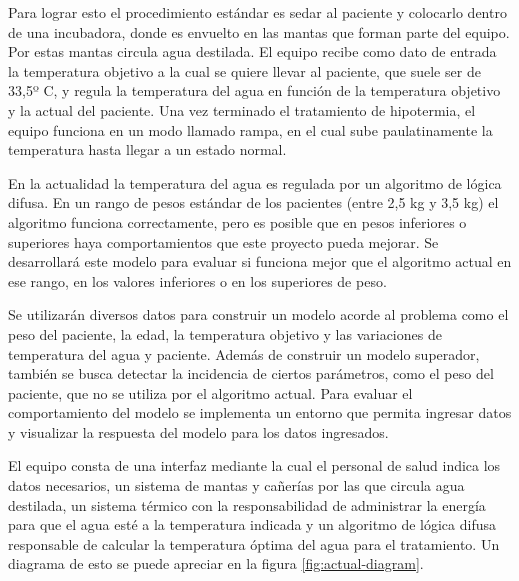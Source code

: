 Para lograr esto el procedimiento estándar es sedar al paciente y colocarlo dentro de una incubadora, donde es envuelto en las mantas que forman parte del equipo. Por estas mantas circula agua destilada. El equipo recibe como dato de entrada la temperatura objetivo a la cual se quiere llevar al paciente, que suele ser de 33,5º C, y regula la temperatura del agua en función de la temperatura objetivo y la actual del paciente. Una vez terminado el tratamiento de hipotermia, el equipo funciona en un modo llamado rampa, en el cual sube paulatinamente la temperatura hasta llegar a un estado normal.

En la actualidad la temperatura del agua es regulada por un algoritmo de lógica difusa. En un rango de pesos estándar de los pacientes (entre 2,5 kg y 3,5 kg) el algoritmo funciona correctamente, pero es posible que en pesos inferiores o superiores haya comportamientos que este proyecto pueda mejorar. Se desarrollará este modelo para evaluar si funciona mejor que el algoritmo actual en ese rango, en los valores inferiores o en los superiores de peso. 

Se utilizarán diversos datos para construir un modelo acorde al problema como el peso del paciente, la edad, la temperatura objetivo y las variaciones de temperatura del agua y paciente. Además de construir un modelo superador, también se busca detectar la incidencia de ciertos parámetros, como el peso del paciente, que no se utiliza por el algoritmo actual. Para evaluar el comportamiento del modelo se implementa un entorno que permita ingresar datos y visualizar la respuesta del modelo para los datos ingresados. 

El equipo consta de una interfaz mediante la cual el personal de salud indica los datos necesarios, un sistema de mantas y cañerías por las que circula agua destilada,  un sistema térmico con la responsabilidad de administrar la energía para que el agua esté a la temperatura indicada y un algoritmo de lógica difusa responsable de calcular la temperatura óptima del agua para el tratamiento. Un diagrama de esto se puede apreciar en la figura \ref{fig:actual-diagram}. 

\vspace{1cm}

